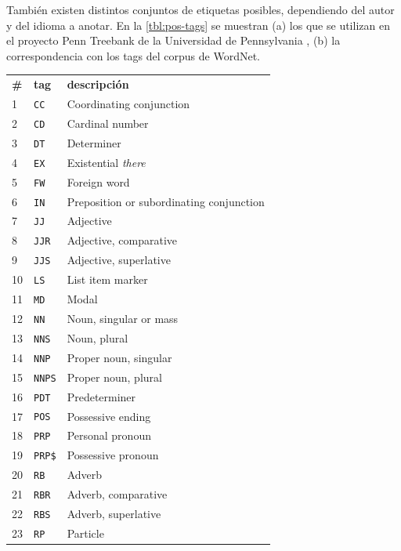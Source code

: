 También existen distintos conjuntos de etiquetas posibles, dependiendo del autor y del idioma a anotar. En la \autoref{tbl:pos-tags} se muestran (a) los que se utilizan en el proyecto Penn Treebank de la Universidad de Pennsylvania \citep{Santorini1990}, (b) la correspondencia con los tags del corpus de WordNet.

\begin{table}[htbp]
\centering
\begin{subtable}[t]{0.60\linewidth}
\centering
\begin{tabular}{|l|l|l|}
\hline
\textbf{\#} & \textbf{tag} & \textbf{descripción} \\ \hhline{===}
1 & \verb=CC= & Coordinating conjunction \\ \hline
2 & \verb=CD= & Cardinal number \\ \hline
3 & \verb=DT= & Determiner \\ \hline
4 & \verb=EX= & Existential \emph{there} \\ \hline
5 & \verb=FW= & Foreign word \\ \hline
6 & \verb=IN= & Preposition or subordinating conjunction \\ \hline
7 & \verb=JJ= & Adjective \\ \hline
8 & \verb=JJR= & Adjective, comparative \\ \hline
9 & \verb=JJS= & Adjective, superlative \\ \hline
10 & \verb=LS= & List item marker \\ \hline
11 & \verb=MD= & Modal \\ \hline
12 & \verb=NN= & Noun, singular or mass \\ \hline
13 & \verb=NNS= & Noun, plural \\ \hline
14 & \verb=NNP= & Proper noun, singular \\ \hline
15 & \verb=NNPS= & Proper noun, plural \\ \hline
16 & \verb=PDT= & Predeterminer \\ \hline
17 & \verb=POS= & Possessive ending \\ \hline
18 & \verb=PRP= & Personal pronoun \\ \hline
19 & \verb=PRP$= & Possessive pronoun \\ \hline
20 & \verb=RB= & Adverb \\ \hline
21 & \verb=RBR= & Adverb, comparative \\ \hline
22 & \verb=RBS= & Adverb, superlative \\ \hline
23 & \verb=RP= & Particle \\ \hline

\end{tabular}
\end{subtable}
\end{table}
